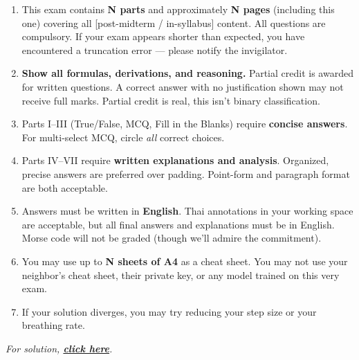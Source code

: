 \begin{enumerate}

\item This exam contains \textbf{N parts} and approximately \textbf{N pages}
(including this one) covering all {[post-midterm / in-syllabus]} content.
All questions are compulsory. If your exam appears shorter than expected,
you have encountered a truncation error --- please notify the invigilator.

\item \textbf{Show all formulas, derivations, and reasoning.}
Partial credit is awarded for written questions.
A correct answer with no justification shown may not receive full marks.
Partial credit is real, this isn't binary classification.

\item Parts I--III (True/False, MCQ, Fill in the Blanks) require
\textbf{concise answers}. For multi-select MCQ, circle \textit{all} correct choices.

\item Parts IV--VII require \textbf{written explanations and analysis}.
Organized, precise answers are preferred over padding.
Point-form and paragraph format are both acceptable.

\item Answers must be written in \textbf{English}.
Thai annotations in your working space are acceptable,
but all final answers and explanations must be in English.
Morse code will not be graded (though we'll admire the commitment).

\item You may use up to \textbf{N sheets of A4} as a cheat sheet.
You may not use your neighbor's cheat sheet, their private key,
or any model trained on this very exam.

\item If your solution diverges,
you may try reducing your step size or your breathing rate.

\end{enumerate}

\vspace{3mm}

\begin{center}
    \textit{For solution,
    \href{https://npwitk.com/mock-exam/solution/REPLACE_ME.pdf}
    {\textbf{click here}}.}
\end{center}
